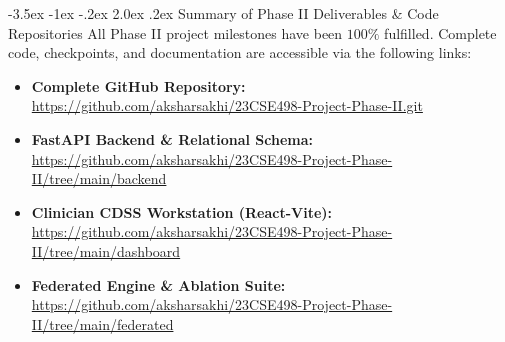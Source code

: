\documentclass[11pt, a4paper]{article}
\makeatletter
\renewcommand\section{\@startsection {section}{1}{\z@}%
                                   {-3.5ex \@plus -1ex \@minus -.2ex}%
                                   {2.0ex \@plus.2ex}%
                                   {\normalfont\large\bfseries\color{amritaMaroon}}}
\makeatother
\begin{document}
\section{Summary of Phase II Deliverables \& Code Repositories}
All Phase II project milestones have been $100\%$ fulfilled. Complete code, checkpoints, and documentation are accessible via the following links:
\begin{itemize}
    \scriptsize
    \item \textbf{Complete GitHub Repository:} \url{https://github.com/aksharsakhi/23CSE498-Project-Phase-II.git}
    \item \textbf{FastAPI Backend \& Relational Schema:} \url{https://github.com/aksharsakhi/23CSE498-Project-Phase-II/tree/main/backend}
    \item \textbf{Clinician CDSS Workstation (React-Vite):} \url{https://github.com/aksharsakhi/23CSE498-Project-Phase-II/tree/main/dashboard}
    \item \textbf{Federated Engine \& Ablation Suite:} \url{https://github.com/aksharsakhi/23CSE498-Project-Phase-II/tree/main/federated}
\end{itemize}

\vspace{0.2cm}
\nocite{churaev2023,jothimurugesan2022,arivazhagan2020,mcmahan2017,liu2022}
\nocite{yang2025mvfl,kalakoti2025fedxai,noseda2025financial,karamanlioglu2025clinical,wang2025personalized}
\nocite{abdelsater2024llama,maher2025automl,gupta2025privacy,yuan2024trend,tang2025horizon}
\nocite{zhang2022multitask,larocca2021attention,amato2023clustering,larocca2022shap,bernardi2023adaptive}
\nocite{dusing2025sepsis,qayyum2023fedsepsis,lei2025supervised,pan2025multiprog,maurya2025secure}



\end{document}
